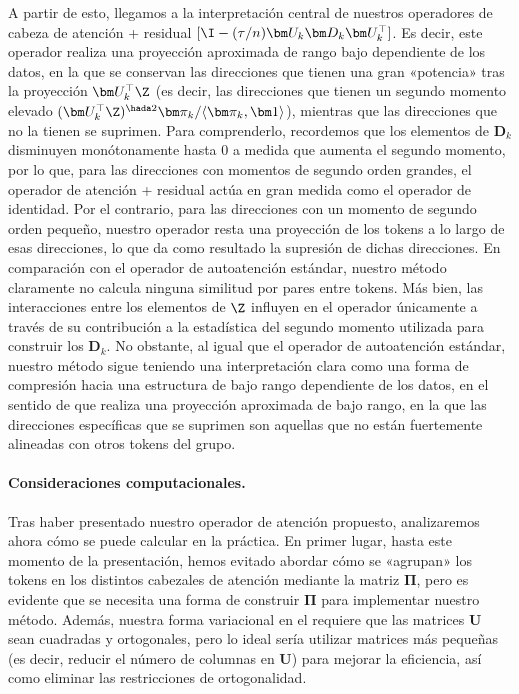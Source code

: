 \documentclass[../../book-main.tex]{subfiles}
\begin{document}
A partir de esto, llegamos a la interpretación central de nuestros operadores de cabeza de atención + residual
$[\I - (\tau/n)\bm U_{k}\bm D_{k}\bm U_{k}^{\top}]$. Es decir, este
operador realiza una proyección aproximada de rango bajo dependiente de los datos, en la que
se conservan las direcciones que tienen una gran «potencia» tras la proyección $\bm
U_k^\top \Z$ (es decir, las direcciones que tienen un segundo momento elevado $(\bm
    U_{k}^{\top}\Z)^{\hada 2}\bm \pi_k / \langle \bm \pi_{k}, \bm
1\rangle$), mientras que las direcciones que no la tienen se
suprimen. Para comprenderlo, recordemos que los elementos de $\bm D_k$
disminuyen monótonamente hasta 0 a medida que aumenta el segundo momento, por lo que, para
las direcciones con momentos de segundo orden grandes, el operador de atención + residual
actúa en gran medida como el operador de identidad. Por el contrario, para
las direcciones con un momento de segundo orden pequeño, nuestro operador resta una
proyección de los tokens a lo largo de esas direcciones, lo que da como resultado la
supresión de dichas direcciones. En comparación con el operador de autoatención
estándar, nuestro método claramente no calcula ninguna similitud
por pares entre tokens. Más bien, las interacciones entre los
elementos de $\Z$ influyen en el operador únicamente a través de su contribución
a la estadística del segundo momento utilizada para construir los $\bm D_{k}$.
No obstante, al igual que el operador de autoatención estándar, nuestro
método sigue teniendo una interpretación clara como una forma de
compresión hacia una estructura de bajo rango dependiente de los datos, en el sentido
de que realiza una proyección aproximada de bajo rango, en la que las
direcciones específicas que se suprimen son aquellas que no están
fuertemente alineadas con otros tokens del grupo.

\paragraph{Consideraciones computacionales.} Tras haber presentado nuestro
operador de atención propuesto, analizaremos ahora cómo se puede calcular
en la práctica. En primer lugar, hasta este momento de la presentación, hemos
evitado abordar cómo se «agrupan» los tokens en los distintos
cabezales de atención mediante la matriz $\bm\Pi$, pero es evidente que se necesita una forma de
construir $\bm\Pi$ para implementar nuestro método.
Además, nuestra forma variacional en el  requiere
que las matrices $\bm U$ sean cuadradas y ortogonales, pero lo ideal
sería utilizar matrices más pequeñas (es decir, reducir el número de
columnas en $\bm U$) para mejorar la eficiencia, así como eliminar las restricciones
de ortogonalidad.
\end{document}
